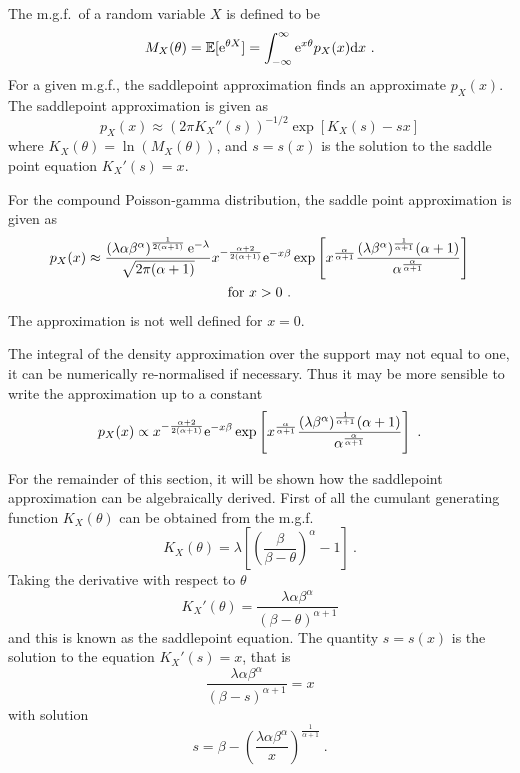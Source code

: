 The m.g.f.~of a random variable $X$ is defined to be
\begin{equation}
  M_X(\theta)=\operatorname{\mathbb{E}}[\mathrm{e}^{\theta X}]
  =
  \int_{-\infty}^{\infty}\mathrm{e}^{x\theta} p_X(x) \mathrm{d} x
  \ .
\end{equation}
For a given m.g.f., the saddlepoint approximation \citep{daniels1954saddlepoint, butler2007saddlepoint} finds an approximate $p_X(x)$. The saddlepoint approximation is given as
\begin{equation}
  p_X(x)\approx\left(2\pi K_X''(s)\right)^{-1/2}\exp\left[K_X(s)-sx\right]
  \label{eq:saddlePoint:generalSaddlePoint}
\end{equation}
where $K_X(\theta) = \ln\left(M_X(\theta)\right)$, and $s=s(x)$ is the solution to the saddle point equation $K_X'(s)=x$.

For the compound Poisson-gamma distribution, the saddle point approximation is given as 
\begin{multline}
  p_X(x)\approx
  \frac{\left(\lambda\alpha\beta^\alpha\right)^{\frac{1}{2(\alpha+1)}}\mathrm{e}^{-\lambda}}{\sqrt{2\pi(\alpha+1)}}x^{-\frac{\alpha+2}{2(\alpha+1)}}
  \mathrm{e}^{-x\beta}
  \exp\left[x^{\frac{\alpha}{\alpha+1}}
    \frac{(\lambda\beta^\alpha)^{\frac{1}{\alpha+1}}(\alpha+1)}{\alpha^{\frac{\alpha}{\alpha+1}}}
  \right]
  \\
  \text{for }x>0 \ .
  \label{eq:saddle_point_approx}
\end{multline}
The approximation is not well defined for $x=0$.

The integral of the density approximation over the support may not equal to one, it can be numerically re-normalised if necessary. Thus it may be more sensible to write the approximation up to a constant
\begin{equation}
  p_X(x)\propto x^{-\frac{\alpha+2}{2(\alpha+1)}}\mathrm{e}^{-x\beta}
  \exp\left[
    x^{\frac{\alpha}{\alpha+1}}
    \frac{
      (\lambda\beta^\alpha)^{\frac{1}{\alpha+1}}(\alpha+1)
    }
    {
      \alpha^{\frac{\alpha}{\alpha+1}}
    }
  \right]
  \ .
\end{equation}

For the remainder of this section, it will be shown how the saddlepoint approximation can be algebraically derived. First of all the cumulant generating function $K_X(\theta)$ can be obtained from the m.g.f.
\begin{equation}
  K_X(\theta) = \lambda
  \left[
    \left(\frac{\beta}{\beta-\theta}\right)^\alpha-1
  \right]
  \ .
\end{equation}
Taking the derivative with respect to $\theta$
\begin{equation}
  K_X'(\theta)=\frac{\lambda\alpha\beta^\alpha}{(\beta-\theta)^{\alpha+1}}
\end{equation}
and this is known as the saddlepoint equation. The quantity $s=s(x)$ is the solution to the equation $K_X'(s)=x$, that is
\begin{equation*}
  \frac{\lambda\alpha\beta^\alpha}{(\beta-s)^{\alpha+1}} = x
\end{equation*}
with solution
\begin{equation}
  s = \beta - \left(\frac{\lambda\alpha\beta^\alpha}{x}\right)^{\frac{1}{\alpha+1}}
  \ .
\end{equation}

